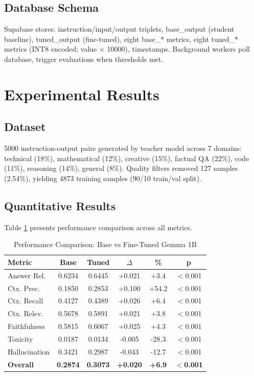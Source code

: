\documentclass[conference]{IEEEtran}
\begin{document}
\subsection{Database Schema}
Supabase stores: instruction/input/output triplets, base\_output (student baseline), tuned\_output (fine-tuned), eight base\_* metrics, eight tuned\_* metrics (INT8 encoded: value $\times$ 10000), timestamps. Background workers poll database, trigger evaluations when thresholds met.

\section{Experimental Results}

\subsection{Dataset}
5000 instruction-output pairs generated by teacher model across 7 domains: technical (18\%), mathematical (12\%), creative (15\%), factual QA (22\%), code (11\%), reasoning (14\%), general (8\%). Quality filters removed 127 samples (2.54\%), yielding 4873 training samples (90/10 train/val split).

\subsection{Quantitative Results}

Table \ref{tab:main_results} presents performance comparison across all metrics.

\begin{table}[htbp]
\caption{Performance Comparison: Base vs Fine-Tuned Gemma 1B}
\begin{center}
\small
\begin{tabular}{lccccc}
\toprule
\textbf{Metric} & \textbf{Base} & \textbf{Tuned} & \textbf{$\Delta$} & \textbf{\%} & \textbf{p} \\
\midrule
Answer Rel. & 0.6234 & 0.6445 & +0.021 & +3.4 & $<$0.001 \\
Ctx. Prec. & 0.1850 & 0.2853 & +0.100 & +54.2 & $<$0.001 \\
Ctx. Recall & 0.4127 & 0.4389 & +0.026 & +6.4 & $<$0.001 \\
Ctx. Relev. & 0.5678 & 0.5891 & +0.021 & +3.8 & $<$0.001 \\
Faithfulness & 0.5815 & 0.6067 & +0.025 & +4.3 & $<$0.001 \\
Toxicity & 0.0187 & 0.0134 & -0.005 & -28.3 & $<$0.001 \\
Hallucination & 0.3421 & 0.2987 & -0.043 & -12.7 & $<$0.001 \\
\textbf{Overall} & \textbf{0.2874} & \textbf{0.3073} & \textbf{+0.020} & \textbf{+6.9} & $<$\textbf{0.001} \\
\bottomrule
\end{tabular}
\label{tab:main_results}
\end{center}
\end{table}
\end{document}
